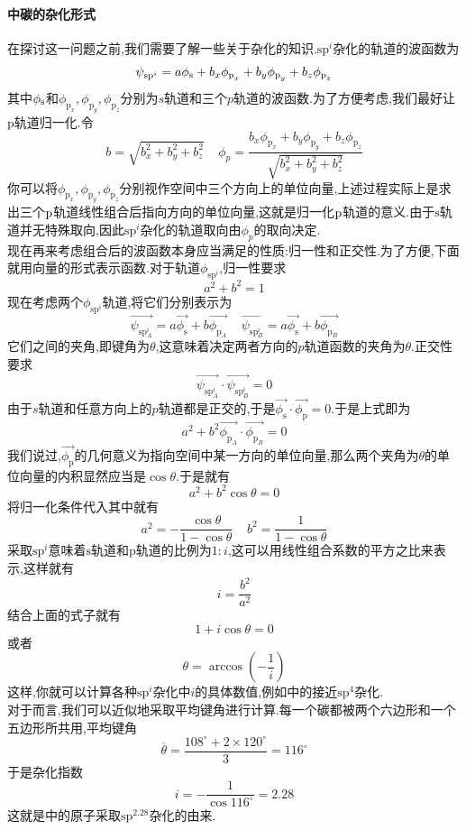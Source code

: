 \documentclass[draft]{ctexart}
\begin{document}
\paragraph{中碳的杂化形式}
在探讨这一问题之前,我们需要了解一些关于杂化的知识.$\text{sp}^i$杂化的轨道的波函数为
\[\psi_{\text{sp}^i}=a\phi_{\text s}+b_x\phi_{\text{p}_x}+b_y\phi_{\text{p}_y}+b_z\phi_{\text{p}_z}\]
其中$\phi_{\text s}$和$\phi_{\text{p}_x},\phi_{\text{p}_y},\phi_{\text{p}_z}$分别为$s$轨道和三个$p$轨道的波函数.为了方便考虑,我们最好让$\text{p}$轨道归一化.令
\[b=\sqrt{b_x^2+b_y^2+b_z^2}\ \ \ \ \ \phi_{p}=\dfrac{b_x\phi_{\text{p}_x}+b_y\phi_{\text{p}_y}+b_z\phi_{\text{p}_z}}{\sqrt{b_x^2+b_y^2+b_z^2}}\]
你可以将$\phi_{\text{p}_x},\phi_{\text{p}_y},\phi_{\text{p}_z}$分别视作空间中三个方向上的单位向量,上述过程实际上是求出三个$\text p$轨道线性组合后指向方向的单位向量,这就是归一化$\text p$轨道的意义.由于$\text{s}$轨道并无特殊取向,因此$\text{sp}^i$杂化的轨道取向由$\phi_p$的取向决定.\\
\indent 现在再来考虑组合后的波函数本身应当满足的性质:归一性和正交性.为了方便,下面就用向量的形式表示函数.对于轨道$\phi_{\text{sp}^i}$,归一性要求
\[a^2+b^2=1\]
现在考虑两个$\phi_{\text{sp}^i}$轨道,将它们分别表示为
\[\overrightarrow{\psi_{\text{sp}^i_A}}=a\overrightarrow{\phi_{\text{s}}}+b\overrightarrow{\phi_{\text{p}_A}}\ \ \ \ \ \overrightarrow{\psi_{\text{sp}^i_B}}=a\overrightarrow{\phi_{\text{s}}}+b\overrightarrow{\phi_{\text{p}_B}}\]
它们之间的夹角,即键角为$\theta$,这意味着决定两者方向的$p$轨道函数的夹角为$\theta$.正交性要求
\[\overrightarrow{\psi_{\text{sp}^i_A}}\cdot\overrightarrow{\psi_{\text{sp}^i_B}}=0\]
由于$s$轨道和任意方向上的$p$轨道都是正交的,于是$\overrightarrow{\phi_{\text{s}}}\cdot\overrightarrow{\phi_{\text{p}}}=0$.于是上式即为
\[a^2+b^2\overrightarrow{\phi_{\text{p}_A}}\cdot\overrightarrow{\phi_{\text{p}_B}}=0\]
我们说过,$\overrightarrow{\phi_{\text{p}}}$的几何意义为指向空间中某一方向的单位向量,那么两个夹角为$\theta$的单位向量的内积显然应当是$\cos\theta$.于是就有
\[a^2+b^2\cos\theta=0\]
将归一化条件代入其中就有
\[a^2=-\dfrac{\cos\theta}{1-\cos\theta}\ \ \ \ \ b^2=\dfrac{1}{1-\cos\theta}\]
采取$\text{sp}^i$意味着$\text{s}$轨道和$\text{p}$轨道的比例为$1:i$,这可以用线性组合系数的平方之比来表示,这样就有
\[i=\dfrac{b^2}{a^2}\]
结合上面的式子就有
\[1+i\cos\theta=0\]
或者
\[\theta=\arccos\left(-\dfrac1i\right)\]
这样,你就可以计算各种$\text{sp}^i$杂化中$i$的具体数值,例如中的接近$\text{sp}^4$杂化.\\
\indent 对于而言,我们可以近似地采取平均键角进行计算.每一个碳都被两个六边形和一个五边形所共用,平均键角
\[\overline{\theta}=\dfrac{108^\circ+2\times120^\circ}{3}=116^\circ\]
于是杂化指数
\[i=-\dfrac{1}{\cos116^\circ}=2.28\]
这就是中的原子采取$\text{sp}^{2.28}$杂化的由来.
\end{document}
